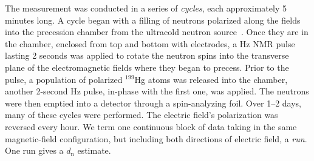 The measurement was conducted in a series of \emph{cycles}, each approximately 5 minutes long. A cycle began with a filling of neutrons polarized along the fields into the precession chamber from the ultracold neutron source~\cite{Steyerl1986}.
Once they are in the chamber, enclosed from top and bottom with electrodes, a \unit[29]{Hz} NMR pulse lasting 2 seconds was applied to rotate the neutron spins into the transverse plane of the electromagnetic fields where they began to precess. Prior to the pulse, a population of polarized $^{199}$Hg atoms was released into the chamber, another 2-second \unit[29]{Hz} pulse, in-phase with the first one, was applied.
The neutrons were then emptied into a detector through a spin-analyzing foil. Over 1--2 days, many of these cycles were performed. The electric field's polarization was reversed every hour. We term one continuous block of data taking in the same magnetic-field configuration, but including both directions of electric field, a \emph{run}. One run gives a $d_\mathrm{n}$ estimate.

